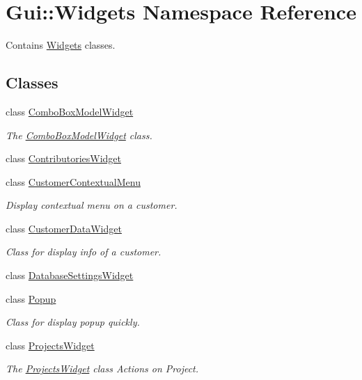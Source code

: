 \hypertarget{namespaceGui_1_1Widgets}{\section{Gui\-:\-:Widgets Namespace Reference}
\label{namespaceGui_1_1Widgets}
}


Contains \hyperlink{namespaceGui_1_1Widgets}{Widgets} classes.  


\subsection*{Classes}
\begin{DoxyCompactItemize}
\item 
class \hyperlink{classGui_1_1Widgets_1_1ComboBoxModelWidget}{Combo\-Box\-Model\-Widget}
\begin{DoxyCompactList}\small\item\em The \hyperlink{classGui_1_1Widgets_1_1ComboBoxModelWidget}{Combo\-Box\-Model\-Widget} class. \end{DoxyCompactList}\item 
class \hyperlink{classGui_1_1Widgets_1_1ContributoriesWidget}{Contributories\-Widget}
\item 
class \hyperlink{classGui_1_1Widgets_1_1CustomerContextualMenu}{Customer\-Contextual\-Menu}
\begin{DoxyCompactList}\small\item\em Display contextual menu on a customer. \end{DoxyCompactList}\item 
class \hyperlink{classGui_1_1Widgets_1_1CustomerDataWidget}{Customer\-Data\-Widget}
\begin{DoxyCompactList}\small\item\em Class for display info of a customer. \end{DoxyCompactList}\item 
class \hyperlink{classGui_1_1Widgets_1_1DatabaseSettingsWidget}{Database\-Settings\-Widget}
\item 
class \hyperlink{classGui_1_1Widgets_1_1Popup}{Popup}
\begin{DoxyCompactList}\small\item\em Class for display popup quickly. \end{DoxyCompactList}\item 
class \hyperlink{classGui_1_1Widgets_1_1ProjectsWidget}{Projects\-Widget}
\begin{DoxyCompactList}\small\item\em The \hyperlink{classGui_1_1Widgets_1_1ProjectsWidget}{Projects\-Widget} class Actions on Project. \end{DoxyCompactList}\item 

\end{DoxyCompactItemize}

